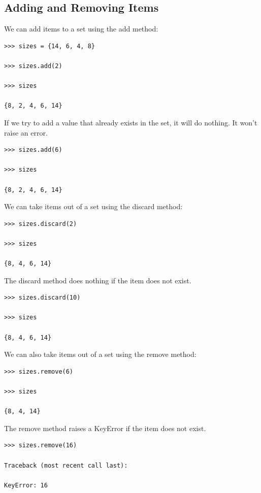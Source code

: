 \documentclass{article}
\begin{document}
\subsection{Adding and Removing Items}

We can add items to a set using the add method:

\begin{lstlisting}
>>> sizes = {14, 6, 4, 8}

>>> sizes.add(2)

>>> sizes

{8, 2, 4, 6, 14}
\end{lstlisting}

If we try to add a value that already exists in the set, it will do nothing. It won't raise an error.

\begin{lstlisting}
>>> sizes.add(6)

>>> sizes

{8, 2, 4, 6, 14}
\end{lstlisting}

We can take items out of a set using the discard method:

\begin{lstlisting}
>>> sizes.discard(2)

>>> sizes

{8, 4, 6, 14}
\end{lstlisting}

The discard method does nothing if the item does not exist.

\begin{lstlisting}
>>> sizes.discard(10)

>>> sizes

{8, 4, 6, 14}
\end{lstlisting}

We can also take items out of a set using the remove method:

\begin{lstlisting}
>>> sizes.remove(6)

>>> sizes

{8, 4, 14}
\end{lstlisting}

The remove method raises a KeyError if the item does not exist.

\begin{lstlisting}
>>> sizes.remove(16)

Traceback (most recent call last):

KeyError: 16
\end{lstlisting}
\end{document}

